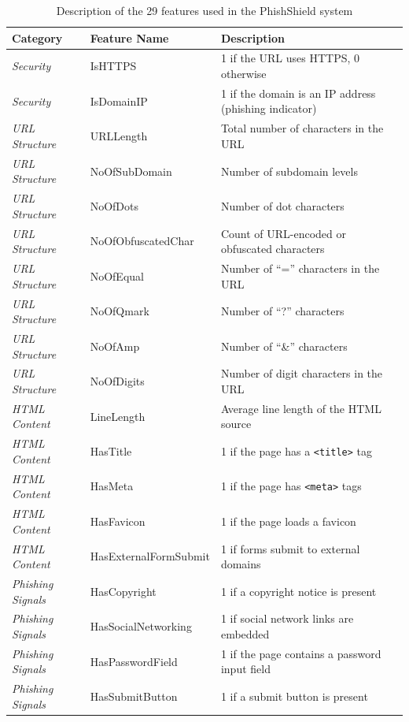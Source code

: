 \begin{table}[H]
\caption{Description of the 29 features used in the PhishShield system}
\label{tab:features}
\vspace{4pt}
\centering
\begin{tabular}{|l|l|p{7cm}|}
\hline
\textbf{Category} & \textbf{Feature Name} & \textbf{Description} \\
\hline
\textit{Security} & IsHTTPS & 1 if the URL uses HTTPS, 0 otherwise \\
\textit{Security} & IsDomainIP & 1 if the domain is an IP address (phishing indicator) \\
\hline
\textit{URL Structure} & URLLength & Total number of characters in the URL \\
\textit{URL Structure} & NoOfSubDomain & Number of subdomain levels \\
\textit{URL Structure} & NoOfDots & Number of dot characters \\
\textit{URL Structure} & NoOfObfuscatedChar & Count of URL-encoded or obfuscated characters \\
\textit{URL Structure} & NoOfEqual & Number of ``='' characters in the URL \\
\textit{URL Structure} & NoOfQmark & Number of ``?'' characters \\
\textit{URL Structure} & NoOfAmp & Number of ``\&'' characters \\
\textit{URL Structure} & NoOfDigits & Number of digit characters in the URL \\
\hline
\textit{HTML Content} & LineLength & Average line length of the HTML source \\
\textit{HTML Content} & HasTitle & 1 if the page has a \texttt{<title>} tag \\
\textit{HTML Content} & HasMeta & 1 if the page has \texttt{<meta>} tags \\
\textit{HTML Content} & HasFavicon & 1 if the page loads a favicon \\
\textit{HTML Content} & HasExternalFormSubmit & 1 if forms submit to external domains \\
\hline
\textit{Phishing Signals} & HasCopyright & 1 if a copyright notice is present \\
\textit{Phishing Signals} & HasSocialNetworking & 1 if social network links are embedded \\
\textit{Phishing Signals} & HasPasswordField & 1 if the page contains a password input field \\
\textit{Phishing Signals} & HasSubmitButton & 1 if a submit button is present \\

\end{tabular}
\end{table}
